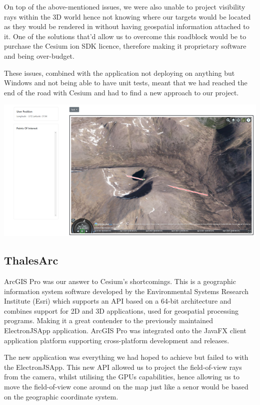 \documentclass{l3proj}
\begin{document}
On top of the above-mentioned issues, we were also unable to project visibility rays within the 3D world hence not knowing where our targets would be located as they would be rendered in without having geospatial information attached to it. One of the solutions that'd allow us to overcome this roadblock would be to purchase the Cesium ion SDK licence, therefore making it proprietary software and being over-budget.

These issues, combined with the application not deploying on anything but Windows and not being able to have unit tests, meant that we had reached the end of the road with Cesium and had to find a new approach to our project.

\includegraphics[width=\textwidth]{ElectronJSApp2}


\subsection{ThalesArc}

ArcGIS Pro was our answer to Cesium’s shortcomings. This is a geographic information system software developed by the Environmental Systems Research Institute (Esri) which supports an API based on a 64-bit architecture and combines support for 2D and 3D applications, used for geospatial processing programs. Making it a great contender to the previously maintained ElectronJSApp application. ArcGIS Pro was integrated onto the JavaFX client application platform supporting cross-platform development and releases.

The new application was everything we had hoped to achieve but failed to with the ElectronJSApp. This new API allowed us to project the field-of-view rays from the camera, whilst utilising the GPUs capabilities, hence allowing us to move the field-of-view cone around on the map just like a senor would be based on the geographic coordinate system.
\end{document}
